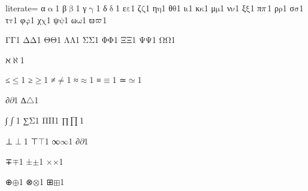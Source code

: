 {%
literate=
{α}{{\ensuremath{\mathrm{\upalpha}}}}1
{β}{{\ensuremath{\mathrm{\upbeta}}}}1
{γ}{{\ensuremath{\mathrm{\upgamma}}}}1
{δ}{{\ensuremath{\mathrm{\updelta}}}}1
{ε}{{\ensuremath{\mathrm{\varepsilon}}}}1
{ζ}{{\ensuremath{\mathrm{\zeta}}}}1
{η}{{\ensuremath{\mathrm{\eta}}}}1
{θ}{{\ensuremath{\mathrm{\theta}}}}1
{ι}{{\ensuremath{\mathrm{\iota}}}}1
{κ}{{\ensuremath{\mathrm{\kappa}}}}1
{μ}{{\ensuremath{\mathrm{\mu}}}}1
{ν}{{\ensuremath{\mathrm{\nu}}}}1
{ξ}{{\ensuremath{\mathrm{\xi}}}}1
{π}{{\ensuremath{\mathrm{\mathnormal{\pi}}}}}1
{ρ}{{\ensuremath{\mathrm{\rho}}}}1
{σ}{{\ensuremath{\mathrm{\sigma}}}}1
{τ}{{\ensuremath{\mathrm{\tau}}}}1
{φ}{{\ensuremath{\mathrm{\varphi}}}}1
{χ}{{\ensuremath{\mathrm{\chi}}}}1
{ψ}{{\ensuremath{\mathrm{\psi}}}}1
{ω}{{\ensuremath{\mathrm{\omega}}}}1
{ϖ}{{\ensuremath{\mathrm{\mathnormal{\varpi}}}}}1 %

{Γ}{{\ensuremath{\mathrm{\Gamma}}}}1
{Δ}{{\ensuremath{\mathrm{\Delta}}}}1
{Θ}{{\ensuremath{\mathrm{\Theta}}}}1
{Λ}{{\ensuremath{\mathrm{\Lambda}}}}1
{Σ}{{\ensuremath{\mathrm{\Sigma}}}}1
{Φ}{{\ensuremath{\mathrm{\Phi}}}}1
{Ξ}{{\ensuremath{\mathrm{\Xi}}}}1
{Ψ}{{\ensuremath{\mathrm{\Psi}}}}1
{Ω}{{\ensuremath{\mathrm{\Omega}}}}1

{ℵ}{{\ensuremath{\aleph}}}1

{≤}{{\color{symbolcolor}\ensuremath{\leq}}}1
{≥}{{\color{symbolcolor}\ensuremath{\geq}}}1
{≠}{{\color{symbolcolor}\ensuremath{\neq}}}1
{≈}{{\color{symbolcolor}\ensuremath{\approx}}}1
{≡}{{\color{symbolcolor}\ensuremath{\equiv}}}1
{≃}{{\color{symbolcolor}\ensuremath{\simeq}}}1

{∂}{{\color{symbolcolor}\ensuremath{\partial}}}1
{∆}{{\color{symbolcolor}\ensuremath{\triangle}}}1 %

{∫}{{\color{symbolcolor}\ensuremath{\int}}}1
{∑}{{\color{symbolcolor}\ensuremath{\mathrm{\Sigma}}}}1
{Π}{{\ensuremath{\mathrm{\Pi}}}}1
{∏}{{\ensuremath{\prod_{}^{}}}}1

{⊥}{{\color{symbolcolor}\ensuremath{\perp}}}1
{⊤}{{\color{symbolcolor}\ensuremath{\top}}}1
{∞}{{\color{symbolcolor}\ensuremath{\infty}}}1
{∂}{{\color{symbolcolor}\ensuremath{\partial}}}1

{∓}{{\color{symbolcolor}\ensuremath{\mp}}}1
{±}{{\color{symbolcolor}\ensuremath{\pm}}}1
{×}{{\color{symbolcolor}\ensuremath{\times}}}1

{⊕}{{\color{symbolcolor}\ensuremath{\oplus}}}1
{⊗}{{\color{symbolcolor}\ensuremath{\otimes}}}1
{⊞}{{\color{symbolcolor}\ensuremath{\boxplus}}}1

}
